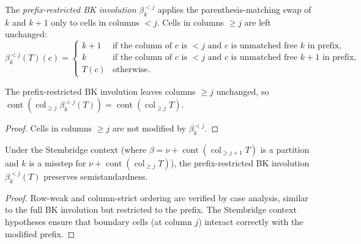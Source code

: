\begin{definition}
\label{def.sf.bk-prefix}
\leanhelper
\leanok
The \emph{prefix-restricted BK involution} $\beta_k^{<j}$ applies the
parenthesis-matching swap of $k$ and $k{+}1$ only to cells in columns
$< j$. Cells in columns $\geq j$ are left unchanged:
\[
  \beta_k^{<j}(T)(c) = \begin{cases}
    k+1 & \text{if the column of } c \text{ is } < j \text{ and } c \text{ is unmatched free } k \text{ in prefix}, \\
    k   & \text{if the column of } c \text{ is } < j \text{ and } c \text{ is unmatched free } k{+}1 \text{ in prefix}, \\
    T(c) & \text{otherwise.}
  \end{cases}
\]
\end{definition}

\begin{lemma}
\label{lem.sf.bk-prefix-content-colgeq}
\leanhelper
\leanok
The prefix-restricted BK involution leaves columns $\geq j$ unchanged,
so
$\operatorname{cont}(\operatorname{col}_{\geq j} \beta_k^{<j}(T))
= \operatorname{cont}(\operatorname{col}_{\geq j} T)$.
\end{lemma}

\begin{proof}
\leanok
Cells in columns $\geq j$ are not modified by $\beta_k^{<j}$.
\end{proof}

\begin{lemma}
\label{lem.sf.bk-prefix-semistandard}
\leanhelper
\leanok
Under the Stembridge context (where $\beta = \nu + \operatorname{cont}(\operatorname{col}_{\geq j+1} T)$
is a partition and $k$ is a misstep for $\nu + \operatorname{cont}(\operatorname{col}_{\geq j} T)$),
the prefix-restricted BK involution $\beta_k^{<j}(T)$ preserves semistandardness.
\end{lemma}

\begin{proof}
\leanok
Row-weak and column-strict ordering are verified by case analysis,
similar to the full BK involution but restricted to the prefix.
The Stembridge context hypotheses ensure that boundary cells (at column $j$)
interact correctly with the modified prefix.
\end{proof}

